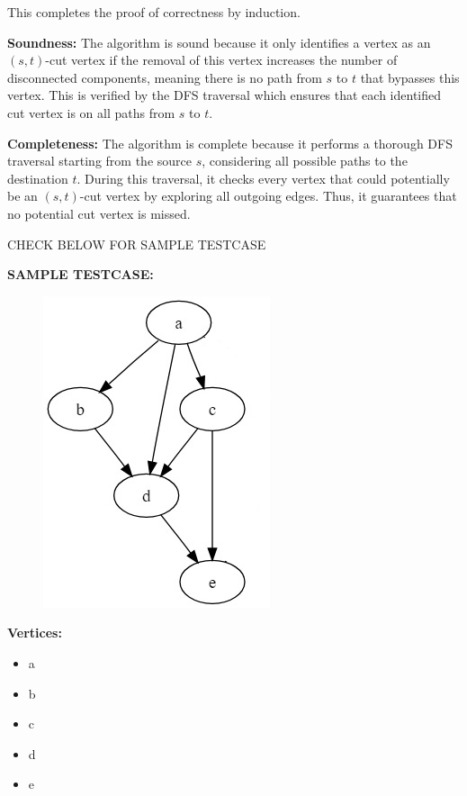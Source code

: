 \documentclass{article}
\begin{document}
            This completes the proof of correctness by induction.

    \textbf{Soundness:} 
        The algorithm is sound because it only identifies a vertex as an $(s, t)$-cut vertex if the removal of this vertex increases the number of disconnected components, meaning there is no path from $s$ to $t$ that bypasses this vertex. This is verified by the DFS traversal which ensures that each identified cut vertex is on all paths from $s$ to $t$.
    
    \textbf{Completeness:} 
        The algorithm is complete because it performs a thorough DFS traversal starting from the source $s$, considering all possible paths to the destination $t$. During this traversal, it checks every vertex that could potentially be an $(s, t)$-cut vertex by exploring all outgoing edges. Thus, it guarantees that no potential cut vertex is missed.

    CHECK BELOW FOR SAMPLE TESTCASE


        \textbf{SAMPLE TESTCASE:}
        
        \begin{figure}
            \centering

            \includegraphics[scale=0.5]{sample-testcase.png}
            \label{fig:enter-label}
        \end{figure}
        
        \textbf{Vertices:}
        \begin{itemize}
            \item a
            \item b
            \item c
            \item d
            \item e
        \end{itemize}
            
\end{document}
